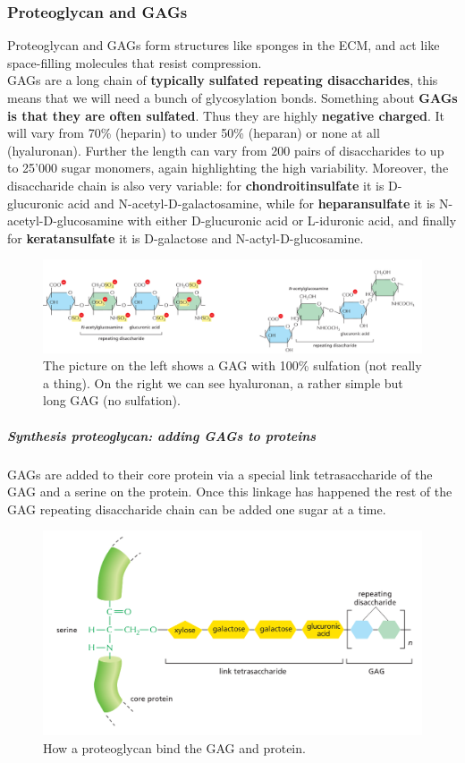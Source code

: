 \documentclass[../main.tex]{subfiles}
\begin{document}
\subsubsection{Proteoglycan and GAGs}
Proteoglycan and GAGs form structures like sponges in the ECM, and act like space-filling molecules that resist compression.\\
GAGs are a long chain of \textbf{typically sulfated repeating disaccharides}, this means that we will need a bunch of glycosylation bonds. Something about \textbf{GAGs is that they are often sulfated}. Thus they are highly \textbf{negative charged}. It will vary from 70\% (\gls{heparin}) to under 50\% (heparan) or none at all (\gls{hyaluronan}). Further the length can vary from 200 pairs of disaccharides to up to 25'000 sugar monomers, again highlighting the high variability. Moreover, the disaccharide chain is also very variable: for \textbf{\gls{chondroitinsulfate}} it is D-glucuronic acid and N-acetyl-D-galactosamine, while for \textbf{\gls{heparansulfate}} it is N-acetyl-D-glucosamine with either D-glucuronic acid or L-iduronic acid, and finally for \textbf{\gls{keratansulfate}} it is D-galactose and N-actyl-D-glucosamine. 

\begin{figure}[H]
	\centering
	\includegraphics[width=0.8\linewidth]{gag_sulf}
	\caption{The picture on the left shows a GAG with 100\% sulfation (not really a thing). On the right we can see hyaluronan, a rather simple but long GAG (no sulfation).}
	\label{fig:gagsulf}
\end{figure}
 

\subparagraph{Synthesis proteoglycan: adding GAGs to proteins}

GAGs are added to their core protein via a special link tetrasaccharide of the GAG and a serine on the protein. Once this linkage has happened the rest of the GAG repeating disaccharide chain can be added one sugar at a time. 

\begin{figure}[H]
	\centering
	\includegraphics[width=0.7\linewidth]{gag_bond}
	\caption{How a proteoglycan bind the GAG and protein.}
	\label{fig:gagbond}
\end{figure}
\end{document}

